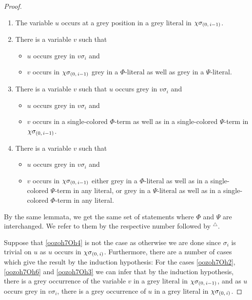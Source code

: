 \documentclass[,%
	draft=false,%
	numbers=noendperiod
	12pt,
	a4paper,
	oneside,%
	openany,
]{memoir}
\newcommand{\inv}{\ensuremath{\chi}}
\begin{document}
\begin{proof}
\begin{enumerate}
		\item
			\label{oozoh7Oh4}
			The variable $u$ occurs at a grey position in a grey literal in $\inv\sigmazmi$.

		\item 
			\label{oozoh7Oh2}
			There is a variable $v$ such that 
			{
				\renewcommand{\labelitemi}{\textendash}
				\begin{itemize}
					\item $u$ occurs grey in $v\sigma_i$ and
					\item $v$ occurs in $\inv\sigmazmi$ grey in a $\Phi$-literal as well as grey in a $\Psi$-literal.
				\end{itemize}
			}


		\item
			\label{oozoh7Oh6}
			There is a variable $v$ such that $u$ occurs grey in $v\sigma_i$ and 
			{
				\renewcommand{\labelitemi}{\textendash}
				\begin{itemize}
					\item $u$ occurs grey in $v\sigma_i$ and
					\item
						$v$ occurs in a single-colored $\Phi$-term as well as in a single-colored $\Psi$-term in $\inv\sigmazmi$.
				\end{itemize}
			}



		\item 
			\label{oozoh7Oh3}
			There is a variable $v$ such that
			{
				\renewcommand{\labelitemi}{\textendash}
				\begin{itemize}
					\item $u$ occurs grey in $v\sigma_i$ and
					\item
						$v$ occurs in $\inv\sigmazmi$
						either grey in a $\Phi$-literal as well as in a single-colored $\Psi$-term in any literal, 
						or grey in a $\Psi$-literal as well as in a single-colored $\Phi$-term in any literal.
				\end{itemize}
			}


	\end{enumerate}

	\newcommand{\othercase}{$^\triangle$}

	By the same lemmata, we get the same set of statements where $\Phi$ and $\Psi$ are interchanged. We refer to them by the respective number followed by \othercase.

	Suppose that \ref{oozoh7Oh4} is not the case as otherwise we are done since $\sigma_i$ is trivial on $u$ as $u$ occurs in $\inv\sigmazi$.
	Furthermore, there are a number of cases which give the result by the induction hypothesis:
	For the cases \ref{oozoh7Oh2}, \ref{oozoh7Oh6} and \ref{oozoh7Oh3} we can infer that by the induction hypothesis, there is a grey occurrence of the variable $v$ in a grey literal in $\inv\sigmazmi$, and as $u$ occurs grey in $v\sigma_i$, there is a grey occurrence of $u$ in a grey literal in $\inv\sigmazi$.


\end{proof}
\end{document}
